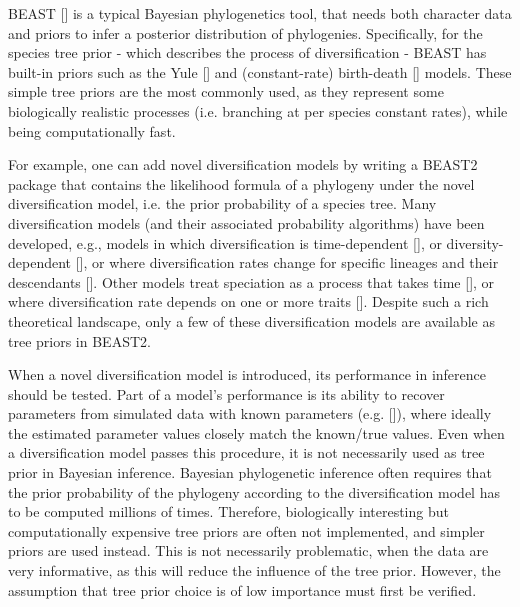 BEAST [\cite{drummond2007beast}] is a typical Bayesian phylogenetics tool, 
that needs both character data and priors to infer 
a posterior distribution of phylogenies.
Specifically, for the species tree prior - which describes 
the process of diversification - 
BEAST has built-in priors such as the Yule [\cite{yule}] and 
(constant-rate) birth-death [\cite{nee1994reconstructed}] models.
These simple tree priors are the most commonly used, 
as they represent some biologically realistic processes (i.e. 
branching at per species constant rates), while being computationally fast.



For example, one can add novel diversification models 
by writing a BEAST2 package that contains the likelihood 
formula of a phylogeny under the novel diversification model, 
i.e. the prior probability of a species tree.
Many diversification models (and their associated probability algorithms) 
have been developed, e.g., models in which diversification is time-dependent [\cite{nee1994reconstructed,rabosky2008explosive}],
or diversity-dependent [\cite{etienne2012diversity}],
or where diversification rates change for specific lineages 
and their descendants [\cite{etienne2012conceptual, rabosky2014automatic, alfaro2009nine}].
Other models treat speciation as a process that takes 
time [\cite{rosindell2010protracted, etienne2012prolonging, lambert2015reconstructed}],
or where diversification rate
depends on one or more traits [\cite{maddison2007estimating, fitzjohn2012diversitree}].
Despite such a rich theoretical landscape, only a few of these 
diversification models are available as tree priors in BEAST2.

When a novel diversification model is introduced,
its performance in inference should be tested.
Part of a model's performance is its ability to 
recover parameters from simulated data with known 
parameters (e.g. [\cite{etienne2014estimating}]), 
where ideally the estimated parameter values closely match the known/true values.
Even when a diversification model passes this procedure, 
it is not necessarily used as tree prior in Bayesian inference.
Bayesian phylogenetic inference often requires 
that the prior probability of the phylogeny 
according to the diversification model has to be computed millions of times. 
Therefore, biologically interesting but computationally expensive tree priors 
are often not implemented, and simpler priors are used instead. 
This is not necessarily problematic, when the data are very informative, 
as this will reduce the influence of the tree prior.
However, the assumption that tree prior choice is of low importance 
must first be verified.

